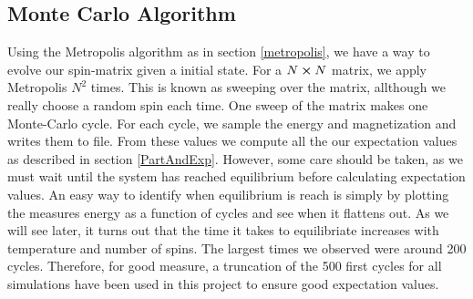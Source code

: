 \subsection{Monte Carlo Algorithm}
Using the Metropolis algorithm as in section \ref{metropolis}, we have a way to evolve our spin-matrix given a initial state. For a $N\cross N$ matrix, we apply Metropolis $N^2$ times. This is known as sweeping over the matrix, allthough we really choose a random spin each time. One sweep of the matrix makes one Monte-Carlo cycle. For each cycle, we sample the energy and magnetization and writes them to file. From these values we compute all the our expectation values as described in section \ref{PartAndExp}. However, some care should be taken, as we must wait until the system has reached equilibrium before 
calculating expectation values. An easy way to identify when equilibrium is reach is simply by plotting the measures energy as a function of cycles and see when it flattens out. As we will see later, it turns out that the time it takes to equilibriate increases with temperature and number of spins. The largest times we observed were around 200 cycles. Therefore, for good measure, a truncation of the 500 first cycles for all simulations have been used in this project to ensure good expectation values.
